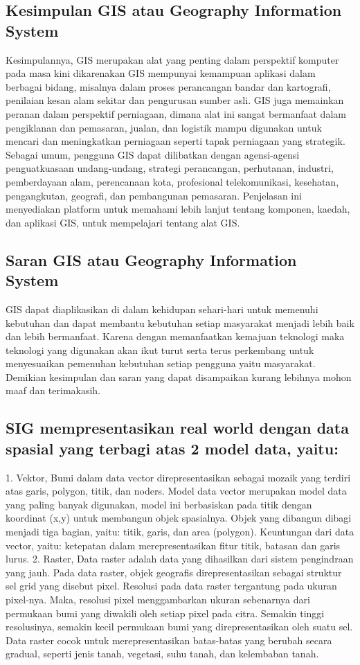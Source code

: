 \subsection{Kesimpulan GIS atau Geography Information System}
Kesimpulannya, GIS merupakan alat yang penting dalam perspektif komputer pada masa kini dikarenakan GIS
mempunyai kemampuan aplikasi dalam berbagai bidang, misalnya dalam proses perancangan bandar dan kartografi,
penilaian kesan alam sekitar dan pengurusan sumber asli. GIS juga memainkan peranan dalam perspektif perniagaan,
dimana alat ini sangat bermanfaat dalam pengiklanan dan pemasaran, jualan, dan logistik 
mampu digunakan untuk mencari dan meningkatkan perniagaan seperti tapak perniagaan yang strategik. Sebagai umum, pengguna GIS dapat dilibatkan dengan agensi-agensi penguatkuasaan undang-undang, strategi
perancangan, perhutanan, industri, pemberdayaan alam, perencanaan kota, profesional
telekomunikasi, kesehatan, pengangkutan, geografi, dan pembangunan pemasaran. 
Penjelasan ini menyediakan platform untuk memahami lebih lanjut tentang komponen, kaedah, dan aplikasi GIS, 
untuk mempelajari tentang alat GIS.
\subsection{Saran GIS atau Geography Information System}
GIS dapat diaplikasikan di dalam kehidupan sehari-hari untuk memenuhi kebutuhan dan dapat membantu kebutuhan setiap masyarakat menjadi lebih baik dan lebih bermanfaat. Karena dengan memanfaatkan kemajuan teknologi maka teknologi yang digunakan akan ikut turut serta terus perkembang untuk menyesuaikan pemenuhan kebutuhan setiap pengguna yaitu masyarakat. Demikian kesimpulan dan saran yang dapat disampaikan kurang lebihnya mohon maaf dan terimakasih.

\subsection{SIG mempresentasikan real world dengan data spasial yang terbagi atas 2 model data, yaitu:}
1. Vektor, Bumi dalam data vector direpresentasikan sebagai mozaik yang terdiri atas garis, polygon, titik,
dan noders.
Model data vector merupakan model data yang paling banyak digunakan, model ini berbasiskan
pada titik dengan koordinat (x,y) untuk membangun objek spasialnya. Objek yang dibangun
dibagi menjadi tiga bagian, yaitu: titik, garis, dan area (polygon).
Keuntungan dari data vector, yaitu: ketepatan dalam merepresentasikan fitur titik, batasan dan
garis lurus.
2. Raster, Data raster adalah data yang dihasilkan dari sistem pengindraan yang jauh. Pada data raster,
objek geografis direpresentasikan sebagai struktur sel grid yang disebut pixel. Resolusi pada data
raster tergantung pada ukuran pixel-nya.
Maka, resolusi pixel menggambarkan ukuran sebenarnya dari permukaan bumi yang diwakili
oleh setiap pixel pada citra. Semakin tinggi resolusinya, semakin kecil permukaan bumi yang
direpresentasikan oleh suatu sel. Data raster cocok untuk merepresentasikan batas-batas yang
berubah secara gradual, seperti jenis tanah, vegetasi, suhu tanah, dan kelembaban tanah.

